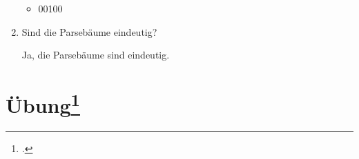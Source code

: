 \documentclass{lehramt-informatik-aufgabe}
\begin{document}
\begin{enumerate}
\begin{itemize}
\item 00100
\end{itemize}

\item Sind die Parsebäume eindeutig?

\begin{liAntwort}
Ja, die Parsebäume sind eindeutig.
\end{liAntwort}
\end{enumerate}

%

\section{Übung\footcite[Seite 25]{theo:fs:2}}
\end{document}
